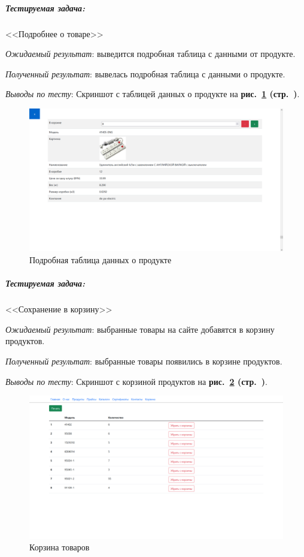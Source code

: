 
\subparagraph{Тестируемая задача:} <<Подробнее о товаре>>

\textit{Ожидаемый результат}: выведится подробная таблица с данными от продукте.

\textit{Полученный результат}: вывелась подробная таблица с данными о продукте.

\textit{Выводы по тесту}: 
Скриншот с таблицей данных о продукте на
\textbf{рис.~\ref{fig:gpi_pz_user_about_product} (стр.~\pageref{fig:gpi_pz_user_about_product})}.

\begin{figure}[!htb]
    \centering
    \includegraphics[width=14cm]
        {_assets/gpi_pz_user_about_product.png}
    \caption{Подробная таблица данных о продукте}
    \label{fig:gpi_pz_user_about_product}
\end{figure}


\subparagraph{Тестируемая задача:} <<Сохранение в корзину>>

\textit{Ожидаемый результат}: выбранные товары на сайте добавятся в корзину продуктов.

\textit{Полученный результат}: выбранные товары появились в корзине продуктов.

\textit{Выводы по тесту}: 
Скриншот с корзиной продуктов на
\textbf{рис.~\ref{fig:gpi_pz_backet} (стр.~\pageref{fig:gpi_pz_backet})}.

\begin{figure}[!htb]
    \centering
    \includegraphics[width=14cm]
        {_assets/gpi_pz_backet.png}
    \caption{Корзина товаров}
    \label{fig:gpi_pz_backet}
\end{figure}


\newpage
